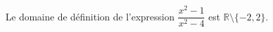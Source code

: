 Le domaine de définition de l'expression $\dfrac{x^2-1}{x^2-4}$ est $\mathbb R \setminus \{-2,2\}$.

\begin{reponses}
\end{reponses}


